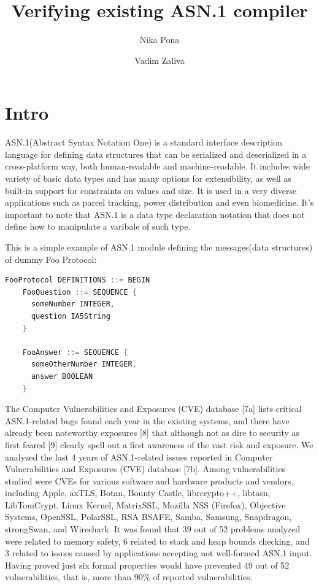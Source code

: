 \documentclass[acmsmall,nonacm]{acmart}
\begin{document}
\title{Verifying existing ASN.1 compiler}

\author{Nika Pona}
\author{Vadim Zaliva}

\maketitle

\begin{abstract}

\end{abstract}

\section{Intro}
 ASN.1(Abstract Syntax Notation One) is a standard interface description language for defining data structures that can be serialized and deserialized in a cross-platform way, both human-readable and machine-readable. It includes wide variety of basic data types and has many options for extensibility, as well as built-in support for constraints on values and size. It is used in a very diverse applications such as parcel tracking, power distribution and even biomedicine. It's important to note that ASN.1 is a data type declaration notation that does not define how to manipulate a varibale of such type.

 This is a simple example of ASN.1 module defining the messages(data structures) of dummy Foo Protocol:
 \begin{lstlisting}[language=C]
  FooProtocol DEFINITIONS ::= BEGIN
    FooQuestion ::= SEQUENCE {
      someNumber INTEGER,
      question IA5String
    }
    
    FooAnswer ::= SEQUENCE {
      someOtherNumber INTEGER,
      answer BOOLEAN
    }
  \end{lstlisting}

 The Computer Vulnerabilities and Exposures (CVE) database [7a] lists critical ASN.1-related bugs found each year in the existing systems, and there have already been noteworthy exposures [8] that although not as dire to security as first feared [9] clearly spell out a first awareness of the vast risk and exposure. We analyzed the last 4 years of ASN.1-related issues reported in Computer Vulnerabilities and Exposures (CVE) database [7b]. Among vulnerabilities studied were CVEs for various software and hardware products and vendors, including Apple, axTLS, Botan, Bounty Castle, librcrypto++, libtasn, LibTomCrypt, Linux Kernel, MatrixSSL, Mozilla NSS (Firefox), Objective Systems, OpenSSL, PolarSSL, RSA BSAFE, Samba, Samsung, Snapdragon, strongSwan, and Wireshark. It was found that 39 out of 52 problems analyzed were related to memory safety, 6 related to stack and heap bounds checking, and 3 related to issues caused by applications accepting not well-formed ASN.1 input. Having proved just six formal properties would have prevented 49 out of 52 vulnerabilities, that is, more than 90\% of reported vulnerabilities.
\end{document}
